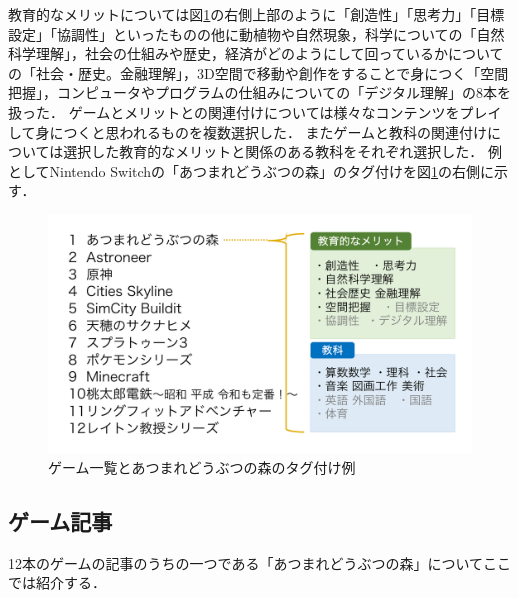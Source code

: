 \documentclass[12pt,a4j,titlepage]{ltjsarticle}
\begin{document}
教育的なメリットについては図\ref{fig:ゲーム一覧}の右側上部のように「創造性」「思考力」「目標設定」「協調性」といったものの他に動植物や自然現象，科学についての「自然科学理解」，社会の仕組みや歴史，経済がどのようにして回っているかについての「社会・歴史。金融理解」，3D空間で移動や創作をすることで身につく「空間把握」，コンピュータやプログラムの仕組みについての「デジタル理解」の8本を扱った．
ゲームとメリットとの関連付けについては様々なコンテンツをプレイして身につくと思われるものを複数選択した．
またゲームと教科の関連付けについては選択した教育的なメリットと関係のある教科をそれぞれ選択した．
例としてNintendo Switchの「あつまれどうぶつの森」のタグ付けを図\ref{fig:ゲーム一覧}の右側に示す．

\vspace{1zh}
\begin{figure}[H]
\begin{center}
 \includegraphics[keepaspectratio, scale=0.35]{PDF/games.pdf}
\end{center}
 \caption{ゲーム一覧とあつまれどうぶつの森のタグ付け例}
 \label{fig:ゲーム一覧}
\end{figure}

\subsection{ゲーム記事}
12本のゲームの記事のうちの一つである「あつまれどうぶつの森」についてここでは紹介する．
\end{document}
